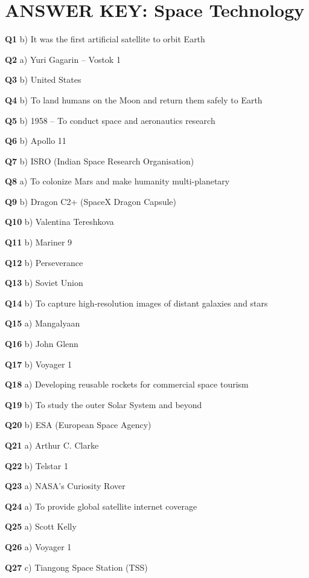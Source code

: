 \section{ANSWER KEY: Space Technology}

\textbf{Q1} b) It was the first artificial satellite to orbit Earth\par
\textbf{Q2} a) Yuri Gagarin – Vostok 1\par
\textbf{Q3} b) United States\par
\textbf{Q4} b) To land humans on the Moon and return them safely to Earth\par
\textbf{Q5} b) 1958 – To conduct space and aeronautics research\par
\textbf{Q6} b) Apollo 11\par
\textbf{Q7} b) ISRO (Indian Space Research Organisation)\par
\textbf{Q8} a) To colonize Mars and make humanity multi‑planetary\par
\textbf{Q9} b) Dragon C2+ (SpaceX Dragon Capsule)\par
\textbf{Q10} b) Valentina Tereshkova\par
\textbf{Q11} b) Mariner 9\par
\textbf{Q12} b) Perseverance\par
\textbf{Q13} b) Soviet Union\par
\textbf{Q14} b) To capture high‑resolution images of distant galaxies and stars\par
\textbf{Q15} a) Mangalyaan\par
\textbf{Q16} b) John Glenn\par
\textbf{Q17} b) Voyager 1\par
\textbf{Q18} a) Developing reusable rockets for commercial space tourism\par
\textbf{Q19} b) To study the outer Solar System and beyond\par
\textbf{Q20} b) ESA (European Space Agency)\par
\textbf{Q21} a) Arthur C. Clarke\par
\textbf{Q22} b) Telstar 1\par
\textbf{Q23} a) NASA's Curiosity Rover\par
\textbf{Q24} a) To provide global satellite internet coverage\par
\textbf{Q25} a) Scott Kelly\par
\textbf{Q26} a) Voyager 1\par
\textbf{Q27} c) Tiangong Space Station (TSS)\par
